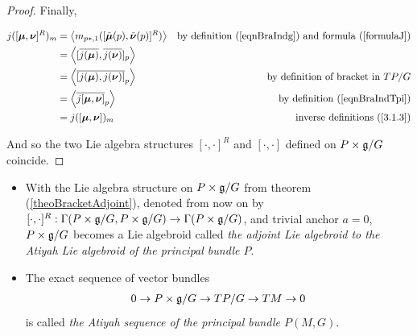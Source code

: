 \begin{proof}
Finally,

\begin{align*}
    j([\bm{\mu}, \bm{\nu}]^R)_m 
    &= \left\langle m_{p*, 1} ([\Tilde{\bm{\mu}}(p), \Tilde{\bm{\nu}}(p)]^R) \right\rangle & \textrm{by definition (\ref{eqnBraIndg}) and formula (\ref{formulaJ})} \\ 
    &= \left\langle [\overline{j(\bm{\mu})}, \overline{j(\bm{\nu})}]_p \right\rangle\\
    &= \left\langle \overline{[j(\bm{\mu}), j(\bm{\nu})]}_p \right\rangle & \textrm{by definition of bracket in $TP/G$}\\
    &= \left\langle \overline{j[\bm{\mu}, \bm{\nu}]}_p \right\rangle & \textrm{by definition (\ref{eqnBraIndTpi})} \\
    &= j([\bm{\mu}, \bm{\nu}])_m & \textrm{inverse definitions (\ref{3.1.3})}
\end{align*}

And so the two Lie algebra structures $[\cdot, \cdot]^R$ and $[\cdot, \cdot]$ defined on $P \times \mathfrak{g}/G$ coincide.

\end{proof}

\begin{definition}\label{AtiyahSeq}
    \begin{itemize}
    
    \item With the Lie algebra structure on $P \times \mathfrak{g}/G$ from theorem (\ref{theoBracketAdjoint}), denoted from now on by $[\cdot, \cdot]^R: \Gamma(P \times \mathfrak{g}/G, P \times \mathfrak{g}/G) \to \Gamma(P \times \mathfrak{g}/G)$, and trivial anchor $a=0$, $P \times \mathfrak{g}/G$ becomes a Lie algebroid called \emph{the adjoint Lie algebroid to the Atiyah Lie algebroid of the principal bundle $P$}.
    
    \item The exact sequence of vector bundles
\begin{align} \label{AtiyahSequence}
    0 \to P \times \mathfrak{g}/G \to TP/G \to TM \to 0
\end{align}
is called \emph{the Atiyah sequence of the principal bundle $P(M, G)$}.
    
    \end{itemize}


\end{definition}


